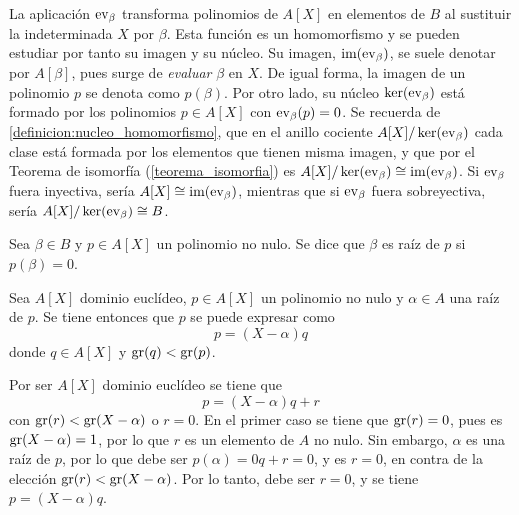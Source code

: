 \begin{obs}
    La aplicación $\operatorname{ev}_\beta$ transforma polinomios de $A[X]$ en elementos de $B$ al sustituir la indeterminada $X$ por $\beta$. Esta función es un homomorfismo y se pueden estudiar por tanto su imagen y su núcleo. Su imagen, $\text{im}(\operatorname{ev}_\beta)$, se suele denotar por $A[\beta]$, pues surge de \textit{evaluar} $\beta$ en $X$. De igual forma, la imagen de un polinomio $p$ se denota como $p(\beta)$. Por otro lado, su núcleo $\ker (\operatorname{ev}_\beta)$ está formado por los polinomios $p\in A[X]$ con $\operatorname{ev}_\beta(p) = 0$. Se recuerda de \ref{definicion:nucleo_homomorfismo}, que en el anillo cociente $A[X]/\ker (\operatorname{ev}_\beta)$ cada clase está formada por los elementos que tienen misma imagen, y que por el Teorema de isomorfía (\ref{teorema_isomorfia}) es $A[X]/\ker (\operatorname{ev}_\beta) \cong \text{im}(\operatorname{ev}_\beta)$. Si $\operatorname{ev}_\beta$ fuera inyectiva, sería $A[X] \cong \text{im}(\operatorname{ev}_\beta)$, mientras que si $\operatorname{ev}_\beta$ fuera sobreyectiva, sería $A[X]/\ker (\operatorname{ev}_\beta) \cong B$.
\end{obs}


\begin{deff}{\cite[p.~113]{GamboaAnillos}}
    Sea $\beta \in B$ y $p\in A[X]$ un polinomio no nulo. Se dice que $\beta$ es raíz de $p$ si $p(\beta) = 0$. 
\end{deff}

\begin{lema}{}\label{lema:rufini}
    Sea $A[X]$ dominio euclídeo, $p\in A[X]$ un polinomio no nulo y $\alpha\in A$ una raíz de $p$. Se tiene entonces que $p$ se puede expresar como \[p = (X-\alpha)q\] donde $q\in A[X]$ y $\text{gr}(q) < \text{gr}(p)$.
\end{lema}

\begin{dem}{\cite[pp.~54-55]{Rosenberger}}
    Por ser $A[X]$ dominio euclídeo se tiene que \[p = (X-\alpha)q + r\] con $\text{gr}(r) < \text{gr}(X-\alpha)$ o $r = 0$. En el primer caso se tiene que $\text{gr}(r) = 0$, pues es $\text{gr}(X-\alpha) = 1$, por lo que $r$ es un elemento de $A$ no nulo. Sin embargo, $\alpha$ es una raíz de $p$, por lo que debe ser $p(\alpha) = 0q + r = 0$, y es $r = 0$, en contra de la elección $\text{gr}(r) < \text{gr}(X-\alpha)$. Por lo tanto, debe ser $r = 0$, y se tiene $p = (X-\alpha)q$.
\end{dem}

